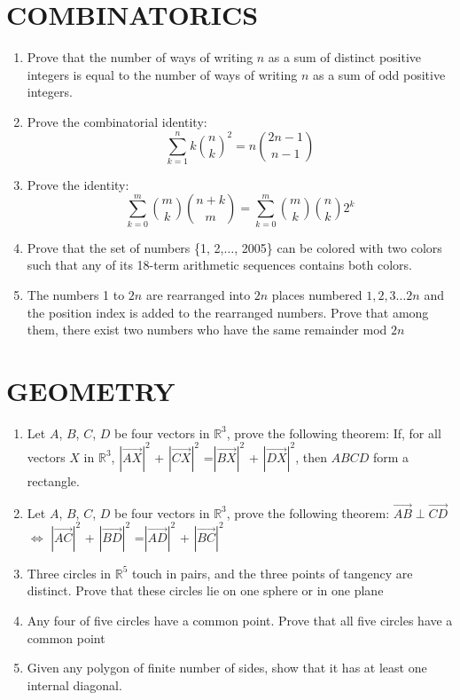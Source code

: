 \documentclass[12pt]{article}
\begin{document}
\section{COMBINATORICS}
\begin{enumerate}
    \item Prove that the number of ways of writing $n$ as a sum of distinct positive integers is equal to the number of ways of writing $n$ as a sum of odd positive integers.
    \item Prove the combinatorial identity:
    \[\sum_{k=1}^{n} k{n \choose k}^{2} = n{2n-1 \choose n-1}\]
    \item Prove the identity:
    \[\sum_{k=0}^{m} {m \choose k}{n+k \choose m} = \sum_{k=0}^{m} {m \choose k}{n \choose k}2^{k}\]
    \item Prove that the set of numbers \{1, 2,$\dots$, 2005\} can be colored with two colors such that any of its 18-term arithmetic sequences contains both colors.
    \item The numbers 1 to $2n$ are rearranged into $2n$ places numbered $1,2,3\dots2n$ and the position index is added to the rearranged numbers. Prove that among them, there exist two numbers who have the same remainder mod $2n$
\end{enumerate}

\section{GEOMETRY}
\begin{enumerate}
    \item Let $A$, $B$, $C$, $D$ be four vectors in $\mathbb{R}^{3}$, prove the following theorem: If, for all vectors $X$ in $\mathbb{R}^{3}$, $|\overrightarrow{AX}|^{2}$ + $|\overrightarrow{CX}|^{2}$ =$|\overrightarrow{BX}|^{2}$ + $|\overrightarrow{DX}|^{2}$, then $ABCD$ form a rectangle.
    \item Let $A$, $B$, $C$, $D$ be four vectors in $\mathbb{R}^{3}$, prove the following theorem: $\overrightarrow{AB}\perp\overrightarrow{CD}$ $\iff$  $|\overrightarrow{AC}|^{2}$ + $|\overrightarrow{BD}|^{2}$ =$|\overrightarrow{AD}|^{2}$ + $|\overrightarrow{BC}|^{2}$
    \item Three circles in $\mathbb{R}^{5}$ touch in pairs, and the three points of tangency are distinct. Prove that these circles lie on one sphere or in one plane
    \item  Any four of five circles have a common point. Prove that all five circles have a common point
    \item Given any polygon of finite number of sides, show that it has at least one internal diagonal.
\end{enumerate}
\end{document}

